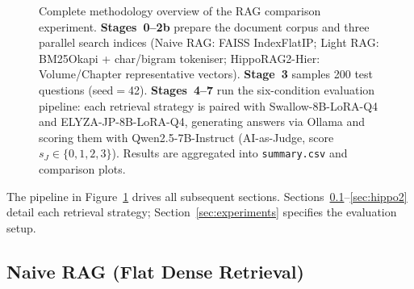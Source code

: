 \documentclass[twocolumn]{article}
\begin{document}
\begin{figure}[t]
\caption{Complete methodology overview of the RAG comparison experiment.
  \textbf{Stages~0--2b} prepare the document corpus and three parallel search
  indices (Naive RAG: FAISS IndexFlatIP; Light RAG: BM25Okapi + char/bigram
  tokeniser; HippoRAG2-Hier: Volume/Chapter representative vectors).
  \textbf{Stage~3} samples 200 test questions (seed$=$42).
  \textbf{Stages~4--7} run the six-condition evaluation pipeline:
  each retrieval strategy is paired with Swallow-8B-LoRA-Q4 and ELYZA-JP-8B-LoRA-Q4,
  generating answers via Ollama and scoring them with Qwen2.5-7B-Instruct
  (AI-as-Judge, score $s_J \in \{0,1,2,3\}$).
  Results are aggregated into \texttt{summary.csv} and comparison plots.}
\label{fig:overview}
\end{figure}

The pipeline in Figure~\ref{fig:overview} drives all subsequent sections.
Sections~\ref{sec:naive}--\ref{sec:hippo2} detail each retrieval strategy;
Section~\ref{sec:experiments} specifies the evaluation setup.

\subsection{Naive RAG (Flat Dense Retrieval)}
\label{sec:naive}
\end{document}
